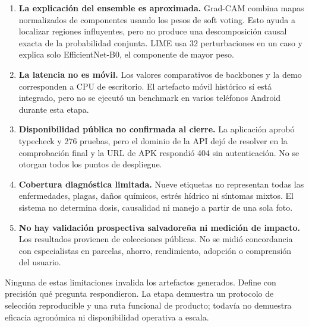 \begin{enumerate}
  \item \textbf{La explicación del ensemble es aproximada.} Grad-CAM combina
  mapas normalizados de componentes usando los pesos de soft voting. Esto ayuda
  a localizar regiones influyentes, pero no produce una descomposición causal
  exacta de la probabilidad conjunta. LIME usa 32 perturbaciones en un caso y
  explica solo EfficientNet-B0, el componente de mayor peso.

  \item \textbf{La latencia no es móvil.} Los valores comparativos de backbones
  y la demo corresponden a CPU de escritorio. El artefacto móvil histórico sí
  está integrado, pero no se ejecutó un benchmark en varios teléfonos Android
  durante esta etapa.

  \item \textbf{Disponibilidad pública no confirmada al cierre.} La aplicación
  aprobó typecheck y 276 pruebas, pero el dominio de la API dejó de resolver en
  la comprobación final y la URL de APK respondió 404 sin autenticación. No se
  otorgan todos los puntos de despliegue.

  \item \textbf{Cobertura diagnóstica limitada.} Nueve etiquetas no representan
  todas las enfermedades, plagas, daños químicos, estrés hídrico ni síntomas
  mixtos. El sistema no determina dosis, causalidad ni manejo a partir de una
  sola foto.

  \item \textbf{No hay validación prospectiva salvadoreña ni medición de
  impacto.} Los resultados provienen de colecciones públicas. No se midió
  concordancia con especialistas en parcelas, ahorro, rendimiento, adopción o
  comprensión del usuario.
\end{enumerate}

Ninguna de estas limitaciones invalida los artefactos generados. Define con
precisión qué pregunta respondieron. La etapa demuestra un protocolo de
selección reproducible y una ruta funcional de producto; todavía no demuestra
eficacia agronómica ni disponibilidad operativa a escala.
